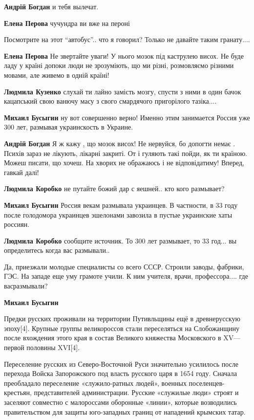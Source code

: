 \begin{itemize}
{\begin{itemize}
\textbf{Андрій Богдан} и тебя вылечат.

\textbf{Елена Перова} чучундра ви вже на пероні \Laughey[1.0]\Laughey[1.0]\Laughey[1.0]\Laughey[1.0]

Посмотрите на этот \enquote{автобус}.. что я говорил? Только не давайте таким гранату....

\textbf{Елена Перова} Не звертайте уваги! У нього мозок під каструлею висох. Не буде ладу у країні допоки люди не зрозуміють, що ми різні, розмовляємо різними мовами, але живемо в одній країні!

\textbf{Людмила Кузенко} слухай ти лайно замість мозгу, спусти з ними в один бачок кацапський свою ванючу масу з свого смардячого пригорілого тазіка....

\textbf{Михаил Бусыгин} ну вот совершенно верно! Именно этим занимается Россия уже 300 лет, размывая украинскость в Украине.

\textbf{Андрій Богдан} Я ж кажу , що мозок висох! Не нервуйся, бо допогти немає . Психів зараз не лікують, лікарні закриті. От і гуляють такі пойди, як ти країною. Можеш писати, що хочеш. На хворих не ображаюсь і не відповідатиму! Вперед, гавкай далі!

\textbf{Людмила Коробко} не путайте божий дар с яешней.. кто кого размывает?

\textbf{Михаил Бусыгин} Россия векам размывала украинцев. В частности, в 33 году после голодомора украинцев эшелонами завозила в пустые украинские хаты россиян.

\textbf{Людмила Коробко} сообщите источник. То 300 лет размывает, то 33 год... вы определитесь когда вас размывали..

Да, приезжали молодые специалисты со всего СССР. Строили заводы, фабрики, ГЭС.
На западе еще уму грамоте учили. К ним учителя, врачи, профессора.... где
васразмывали?

\textbf{Михаил Бусыгин} 

Предки русских проживали на территории Путивльщины ещё в древнерусскую
эпоху[4]. Крупные группы великороссов стали переселяться на Слобожанщину после
вхождения этого края в состав Великого княжества Московского в XV—первой
половины XVI[4].

Переселение русских из Северо-Восточной Руси значительно усилилось после
перехода Войска Запорожского под власть русского царя в 1654 году. Сначала
преобладало переселение «служило-ратных людей», военных поселенцев-крестьян,
представителей администрации. Русские «служилые люди» строят и заселяют
совместно с малороссами оборонные «линии», которые возводились правительством
для защиты юго-западных границ от нападений крымских татар.


\end{itemize}}
\end{itemize}
